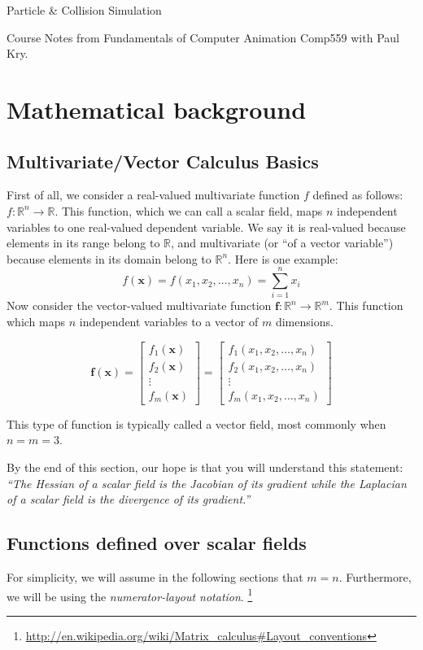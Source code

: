 \documentclass{article}
\begin{document}
\renewcommand{\arraystretch}{1.9}
\centerline{\sc \large Particle \& Collision Simulation}
\centerline{Course Notes from Fundamentals of Computer Animation Comp559 with Paul Kry.}

\section{Mathematical background}
\subsection{Multivariate/Vector Calculus Basics} First of all, we consider a
real-valued multivariate function $f$ defined as follows: $f:\mathbb{R}^n
\longrightarrow \mathbb{R}$. This function, which we can call a scalar field,
maps $n$ independent variables to one real-valued dependent variable. We say it is real-valued because elements in its range belong to $\mathbb{R}$, and multivariate (or ``of a vector variable'') because elements in its domain belong to $\mathbb{R}^n$. Here is one example:
\[
    f(\mathbf{x}) = f(x_1, x_2, \dots, x_n) = \sum_{i=1}^n x_i
\]
Now consider the vector-valued multivariate function $\mathbf{f}:\mathbb{R}^n \longrightarrow
\mathbb{R}^m$. This function which maps $n$ independent variables to a vector of
$m$ dimensions.

\[
\mathbf{f}(\mathbf{x}) = 
\begin{bmatrix}
    f_1(\mathbf{x}) \\
    f_2(\mathbf{x}) \\
    \vdots \\
    f_m(\mathbf{x})
\end{bmatrix}
=
\begin{bmatrix}
    f_1(x_1, x_2, \dots, x_n) \\
    f_2(x_1, x_2, \dots, x_n) \\
    \vdots \\
    f_m(x_1, x_2, \dots, x_n)
\end{bmatrix}
\]

This type of function is typically called a vector field, most commonly when $n=m=3$. 


By the end of this section, our hope is that you will
understand this statement: \textit{``The Hessian of a scalar field is the
Jacobian of its gradient while the Laplacian of a scalar field is the divergence
of its gradient.''}
\subsection{Functions defined over scalar fields}
For simplicity, we will assume in the following sections that $m=n$.
Furthermore, we will be using the \textit{numerator-layout notation}. 
\footnote{\url{http://en.wikipedia.org/wiki/Matrix\_calculus\#Layout\_conventions}}
\end{document}
